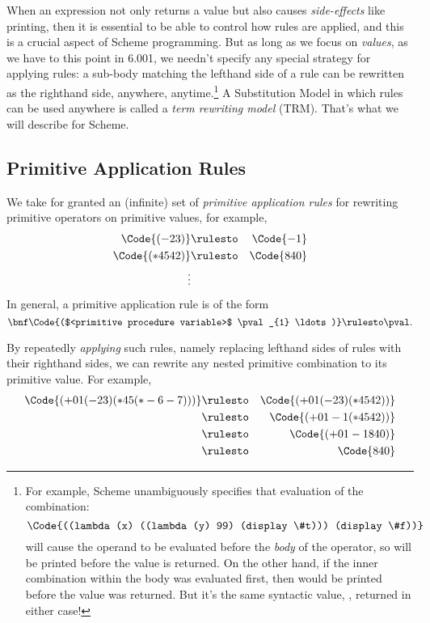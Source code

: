 \documentclass[11pt]{article}
\begin{document}
When an expression not only returns a value but also causes {\em
side-effects} like printing, then it is essential to be able to control
how rules are applied, and this is a crucial aspect of Scheme programming.
But as long as we focus on {\em values}, as we have to this point in
6.001, we needn't specify any special strategy for applying rules: a
sub-body matching the lefthand side of a rule can be rewritten as the
righthand side, anywhere, anytime.\footnote{For example, Scheme
unambiguously specifies that evaluation of the combination:
\[\Code{((lambda (x) ((lambda (y) 99) (display \#t))) (display \#f))}\]
will cause the operand to be evaluated before the {\em body} of the
operator, so  will be printed before the value  is
returned.  On the other hand, if the inner  combination
within the body was evaluated first, then  would be printed
before the value  was returned.  But it's the same syntactic
value, , returned in either case!} A Substitution Model in which
rules can be used anywhere is called a {\em term rewriting model} (TRM).
That's what we will describe for Scheme.

\subsection{Primitive Application Rules}
We take for granted an (infinite) set of {\em primitive application rules\/}
for rewriting primitive operators on primitive values, for example,
\begin{eqnarray*}
\Code{(- 2 3)}  & \rulesto & \Code{-1}\\
\Code{(* 4 5 42)}  & \rulesto & \Code{840}\\
\vdots
\end{eqnarray*}
In general, a primitive application rule is of the form
\[\bnf\Code{($<primitive procedure variable>$ \pval_{1} \ldots)} \rulesto \pval.\]

By repeatedly {\em applying\/} such rules, namely replacing lefthand sides
of rules with their righthand sides, we can rewrite any nested primitive
combination to its primitive value.  For example,
\begin{eqnarray*}
\Code{(+ 0 1 (- 2 3) (* 4 5 (* -6 -7)))}  & \rulesto & \Code{(+ 0 1 (- 2 3) (* 4 5 42))}\\
{}&  \rulesto & \Code{(+ 0 1 -1 (* 4 5 42))}\\
{}&  \rulesto & \Code{(+ 0 1 -1 840)}\\
{}&  \rulesto & \Code{840}
\end{eqnarray*}
\end{document}
